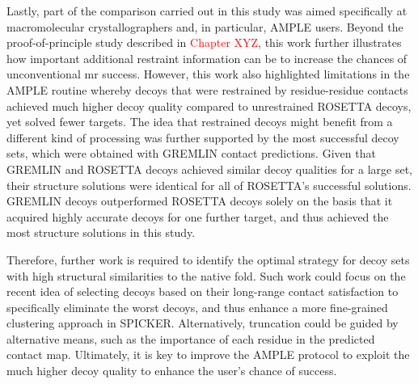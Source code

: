 Lastly, part of the comparison carried out in this study was aimed specifically at macromolecular crystallographers and, in particular, AMPLE users. Beyond the proof-of-principle study described in \textcolor{red}{Chapter XYZ}, this work further illustrates how important additional restraint information can be to increase the chances of unconventional \gls{mr} success. However, this work also highlighted limitations in the AMPLE routine whereby decoys that were restrained by residue-residue contacts achieved much higher decoy quality compared to unrestrained ROSETTA decoys, yet solved fewer targets. The idea that restrained decoys might benefit from a different kind of processing was further supported by the most successful decoy sets, which were obtained with GREMLIN contact predictions. Given that GREMLIN and ROSETTA decoys achieved similar decoy qualities for a large set, their structure solutions were identical for all of ROSETTA’s successful solutions. GREMLIN decoys outperformed ROSETTA decoys solely on the basis that it acquired highly accurate decoys for one further target, and thus achieved the most structure solutions in this study. 

Therefore, further work is required to identify the optimal strategy for decoy sets with high structural similarities to the native fold. Such work could focus on the recent idea of selecting decoys based on their long-range contact satisfaction \cite{De_Oliveira2017-yf, Ovchinnikov2017-nd} to specifically eliminate the worst decoys, and thus enhance a more fine-grained clustering approach in SPICKER. Alternatively, truncation could be guided by alternative means, such as the importance of each residue in the predicted contact map. Ultimately, it is key to improve the AMPLE protocol to exploit the much higher decoy quality to enhance the user’s chance of success.
